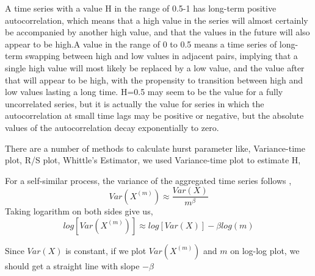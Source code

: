 A time series with a value H in the range of 0.5-1 has long-term positive autocorrelation, which means that a high value in the series will almost certainly be accompanied by another high value, and that the values in the future will also appear to be high.A value in the range of 0 to 0.5 means a time series of long-term swapping between high and low values in adjacent pairs, implying that a single high value will most likely be replaced by a low value, and the value after that will appear to be high, with the propensity to transition between high and low values lasting a long time. H=0.5 may seem to be the value for a fully uncorrelated series, but it is actually the value for series in which the autocorrelation at small time lags may be positive or negative, but the absolute values of the autocorrelation decay exponentially to zero.

There are a number of methods to calculate hurst parameter like, Variance-time plot, R/S plot, Whittle's Estimator, we used Variance-time plot to estimate H,

For a self-similar process, the variance of the aggregated time series follows ,
\[
Var(X^{(m)})\approx \frac{Var(X)}{m^\beta}
\]
Taking logarithm on both sides give us,
\[
log[Var(X^{(m)})]\approx log[Var(X)]-\beta log(m)
\]

Since $Var(X)$ is constant, if we plot $Var(X^{(m)})$ and $m$ on log-log plot, we should get a straight line with slope $ -\beta$

